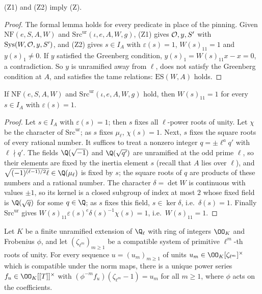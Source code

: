 \begin{lemma}\label{pf:kato:halves}
\textup{(Z1)} and \textup{(Z2)} imply \textup{(Z)}.
\end{lemma}

\begin{proof}
The formal lemma holds for every predicate in place of the pinning. Given $\mathrm{NF}(e,S,A,W)$ and
$\mathrm{Src}^{\mathrm{ur}}(\iota,e,A,W,g)$, \textup{(Z1)} gives $\mathcal{O},y,S'$ with $\mathrm{Sys}(W,\mathcal{O},y,S')$, and \textup{(Z2)} gives
$s\in I_A$ with $\varepsilon(s)=1$, $W(s)_{11}=1$ and $y(s)_1\ne0$. If $y$ satisfied the Greenberg condition,
$y(s)_1=W(s)_{11}x-x=0$, a contradiction. So $y$ is unramified away from $\ell$, does not satisfy the Greenberg condition at
$A$, and satisfies the tame relations: $\mathrm{ES}(W,A)$ holds.
\end{proof}

\begin{lemma}\label{pf:kato:quotchar}
If $\mathrm{NF}(e,S,A,W)$ and $\mathrm{Src}^{\mathrm{ur}}(\iota,e,A,W,g)$ hold, then $W(s)_{11}=1$ for every $s\in I_A$ with $\varepsilon(s)=1$.
\end{lemma}

\begin{proof}
Let $s\in I_A$ with $\varepsilon(s)=1$; then $s$ fixes all $\ell$-power roots of unity. Let $\chi$ be the character of
$\mathrm{Src}^{\mathrm{ur}}$; as $s$ fixes $\mu_\ell$, $\chi(s)=1$. Next, $s$ fixes the square roots of every rational number. It
suffices to treat a nonzero integer $q=\pm\ell^aq'$ with $\ell\nmid q'$. The fields $\Q(\sqrt{-1})$ and $\Q(\sqrt{q'})$ are unramified
at the odd prime $\ell$, so their elements are fixed by the inertia element $s$ (recall that $A$ lies over $\ell$), and
$\sqrt{(-1)^{(\ell-1)/2}\ell}\in\Q(\mu_\ell)$ is fixed by $s$; the square roots of $q$ are products of these numbers and a rational number.
The character $\delta=\det W$ is continuous with values $\pm1$, so its kernel is a closed subgroup of index at most $2$ whose fixed
field is $\Q(\sqrt q)$ for some $q\in\Q$; as $s$ fixes this field, $s\in\ker\delta$, i.e.\ $\delta(s)=1$. Finally $\mathrm{Src}^{\mathrm{ur}}$ gives
$W(s)_{11}\varepsilon(s)^e\delta(s)^{-1}\chi(s)=1$, i.e.\ $W(s)_{11}=1$.
\end{proof}

\begin{littheorem}\label{pf:kato:lit:coleman}
Let $K$ be a finite unramified extension of $\Q_\ell$ with ring of integers $\OO_K$ and Frobenius $\phi$, and let $(\zeta_{\ell^m})_{m\ge1}$ be a
compatible system of primitive $\ell^m$-th roots of unity. For every sequence $u=(u_m)_{m\ge1}$ of units $u_m\in\OO_K[\zeta_{\ell^m}]^\times$
which is compatible under the norm maps, there is a unique power series $f_u\in\OO_K[[T]]^\times$ with
$(\phi^{-m}f_u)(\zeta_{\ell^m}-1)=u_m$ for all $m\ge1$, where $\phi$ acts on the coefficients.
\end{littheorem}

